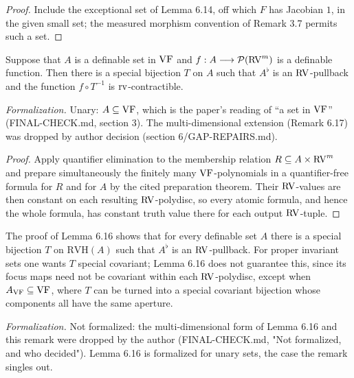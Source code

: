 \begin{proof}
Include the exceptional set of Lemma 6.14, off which $F$ has Jacobian $1$, in the given small set; the measured morphism convention of Remark 3.7 permits such a set.
\end{proof}

\setcounter{theorem}{15}
\begin{lemma}
\label{special-bi-term-constant}
\leanok
{}
Suppose that $A$ is a definable set in $\mathrm{VF}$ and $f:A\longrightarrow\mathcal{P}(\mathrm{RV}^m)$ is a definable function. Then there is a special bijection $T$ on $A$ such that $A^\flat$ is an $\mathrm{RV}$-pullback and the function $f\circ T^{-1}$ is $\operatorname{rv}$-contractible.

\emph{Formalization.} Unary: $A\subseteq\mathrm{VF}$, which is the paper's reading of ``a set in $\mathrm{VF}$'' (FINAL-CHECK.md, section 3). The multi-dimensional extension (Remark 6.17) was dropped by author decision (section 6/GAP-REPAIRS.md).
\end{lemma}

\begin{proof}
\leanok
Apply quantifier elimination to the membership relation $R\subseteq A\times\mathrm{RV}^m$ and prepare simultaneously the finitely many $\mathrm{VF}$-polynomials in a quantifier-free formula for $R$ and for $A$ by the cited preparation theorem. Their $\mathrm{RV}$-values are then constant on each resulting $\mathrm{RV}$-polydisc, so every atomic formula, and hence the whole formula, has constant truth value there for each output $\mathrm{RV}$-tuple.
\end{proof}

\setcounter{theorem}{16}
\begin{remark}
\label{special-pseudo}
The proof of Lemma 6.16 shows that for every definable set $A$ there is a special bijection $T$ on $\mathrm{RVH}(A)$ such that $A^\flat$ is an $\mathrm{RV}$-pullback. For proper invariant sets one wants $T$ special covariant; Lemma 6.16 does not guarantee this, since its focus maps need not be covariant within each $\mathrm{RV}$-polydisc, except when $A_{\mathrm{VF}} \subseteq \mathrm{VF}$, where $T$ can be turned into a special covariant bijection whose components all have the same aperture.

\emph{Formalization.} Not formalized: the multi-dimensional form of Lemma 6.16 and this remark were dropped by the author (FINAL-CHECK.md, "Not formalized, and who decided"). Lemma 6.16 is formalized for unary sets, the case the remark singles out.
\end{remark}

